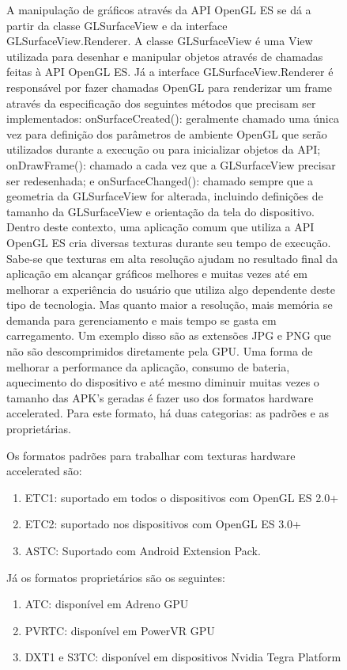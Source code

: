 \documentclass[sigconf]{acmart}
\begin{document}
\begin{figure}[h!]
A manipulação de gráficos através da API OpenGL ES se dá a partir da classe GLSurfaceView e da interface GLSurfaceView.Renderer.
A classe GLSurfaceView é uma View utilizada para desenhar e manipular objetos através de chamadas feitas à API OpenGL ES. Já a interface GLSurfaceView.Renderer é responsável por fazer chamadas OpenGL para renderizar um frame através da especificação dos seguintes métodos que precisam ser implementados:
onSurfaceCreated(): geralmente chamado uma única vez para definição dos parâmetros de ambiente OpenGL que serão utilizados durante a execução ou para inicializar objetos da API;
onDrawFrame(): chamado a cada vez que a GLSurfaceView precisar ser redesenhada;
e onSurfaceChanged(): chamado sempre que a geometria da GLSurfaceView for alterada, incluindo definições de tamanho da GLSurfaceView e orientação da tela do dispositivo.
Dentro deste contexto, uma aplicação comum que utiliza a API OpenGL ES cria diversas texturas durante seu tempo de execução. Sabe-se que texturas em alta resolução ajudam no resultado final da aplicação em alcançar gráficos melhores e muitas vezes até em melhorar a experiência do usuário que utiliza algo dependente deste tipo de tecnologia. Mas quanto maior a resolução, mais memória se demanda para gerenciamento e mais tempo se gasta em carregamento. Um exemplo disso são as extensões JPG e PNG que não são descomprimidos diretamente pela GPU.
Uma forma de melhorar a performance da aplicação, consumo de bateria, aquecimento do dispositivo e até mesmo diminuir muitas vezes o tamanho das APK's geradas é fazer uso dos formatos hardware accelerated. Para este formato, há duas categorias: as padrões e as proprietárias.

Os formatos padrões para trabalhar com texturas hardware accelerated são:

\begin{enumerate}
    \item ETC1: suportado em todos o dispositivos com OpenGL ES 2.0+
    \item ETC2: suportado nos dispositivos com OpenGL ES 3.0+
    \item ASTC: Suportado com Android Extension Pack.
\end{enumerate}

Já os formatos proprietários são os seguintes:

\begin{enumerate}
    \item ATC: disponível em Adreno GPU
    \item PVRTC: disponível em PowerVR GPU
    \item DXT1 e S3TC: disponível em dispositivos Nvidia Tegra Platform
\end{enumerate}


\end{figure}
\end{document}
